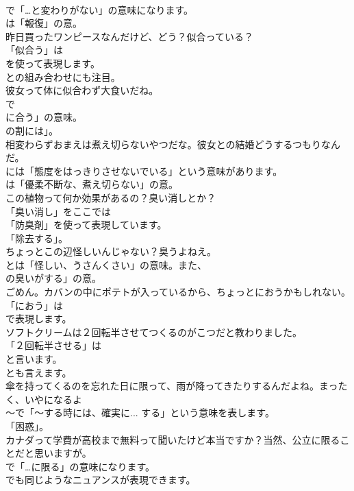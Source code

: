 \documentclass[8pt]{extreport}
\begin{document}
\begin{CJK}{UTF8}{min}
\\	で「…と変わりがない」の意味になります。
\\	は「報復」の意。	
\\	昨日買ったワンピースなんだけど、どう？似合っている？ 
\\	「似合う」は 
\\	を使って表現します。
\\	との組み合わせにも注目。	
\\	彼女って体に似合わず大食いだね。 
\\	で
\\	に合う」の意味。
\\	の割には」。	
\\	相変わらずおまえは煮え切らないやつだな。彼女との結婚どうするつもりなんだ。 
\\	には「態度をはっきりさせないでいる」という意味があります。
\\	は「優柔不断な、煮え切らない」の意。	
\\	この植物って何か効果があるの？臭い消しとか？ 
\\	「臭い消し」をここでは
\\	「防臭剤」を使って表現しています。
\\	「除去する」。	
\\	ちょっとこの辺怪しいんじゃない？臭うよねえ。 
\\	とは「怪しい、うさんくさい」の意味。また、
\\	の臭いがする」の意。	
\\	ごめん。カバンの中にポテトが入っているから、ちょっとにおうかもしれない。 
\\	「におう」は
\\	で表現します。	
\\	ソフトクリームは２回転半させてつくるのがこつだと教わりました。 
\\	「２回転半させる」は
\\	と言います。
\\	とも言えます。	
\\	傘を持ってくるのを忘れた日に限って、雨が降ってきたりするんだよね。まったく、いやになるよ 
\\	～で「～する時には、確実に... する」という意味を表します。
\\	「困惑」。	
\\	カナダって学費が高校まで無料って聞いたけど本当ですか？当然、公立に限ることだと思いますが。 
\\	で「…に限る」の意味になります。
\\	でも同じようなニュアンスが表現できます。	

\end{CJK}
\end{document}
